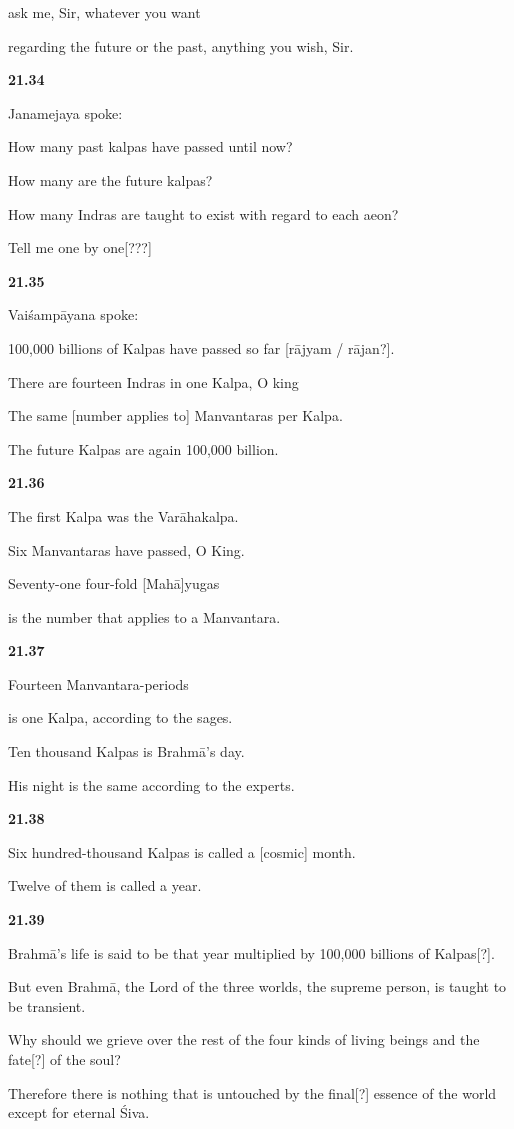 \documentclass[12pt]{article} %
\begin{document}
      ask me, Sir, whatever you want 

      regarding the future or the past, anything you wish, Sir. 

\textbf{21.34}

 Janamejaya spoke: 

      How many past kalpas have passed until now? 

      How many are the future kalpas? 

      How many Indras are taught to exist with regard to each aeon? 

	Tell me one by one[???]
	  
\textbf{21.35}

 Vaiśampāyana spoke: 

      100,000 billions of Kalpas have passed so far [rājyam / rājan?]. 

	There are fourteen Indras in one Kalpa, O king

	The same [number applies to] Manvantaras per Kalpa.

      The future Kalpas are again 100,000 billion. 

\textbf{21.36}

 The first Kalpa was the Varāhakalpa. 

      Six Manvantaras have passed, O King. 

      Seventy-one four-fold [Mahā]yugas

	is the number that applies to a Manvantara.

\textbf{21.37}

 Fourteen Manvantara-periods 

      is one Kalpa, according to the sages. 

      Ten thousand Kalpas is Brahmā's day. 

      His night is the same according to the experts. 

\textbf{21.38}

 Six hundred-thousand Kalpas is called a [cosmic] month. 

      Twelve of them is called a year. 

\textbf{21.39}

 Brahmā's life is said to be that year multiplied by 100,000 billions of 
Kalpas[?].

      But even Brahmā, the Lord of the three worlds, the supreme person, is 
      taught to be transient. 
      
      Why should we grieve over the rest of the four kinds of living beings and the fate[?] of the soul?
      
      Therefore there is nothing that is untouched by the final[?] essence of the world except for eternal Śiva. 
\end{document}
